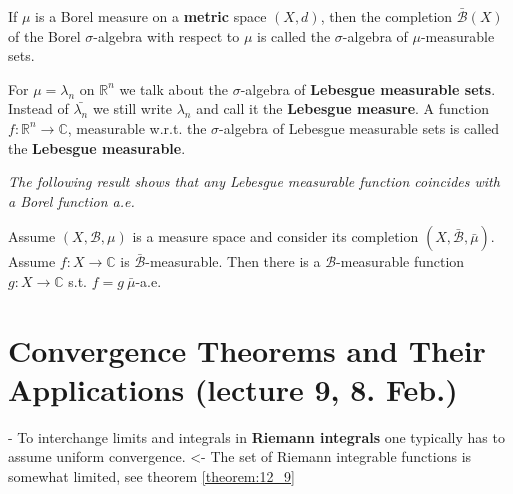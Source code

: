 
\begin{definition}
    If \(\mu\) is a Borel measure on a \textbf{metric} space \((X,d)\), then the completion \(\bar{\mathscr{B}}(X)\) of the Borel \(\sigma\)-algebra
    with respect to \(\mu\) is called the \(\sigma\)-algebra of \(\mu\)-measurable sets. 
\end{definition}
\begin{remark}
    For \(\mu=\lambda_n\) on \(\mathbb{R}^n\) we talk about the \(\sigma\)-algebra of \textbf{Lebesgue measurable sets}. Instead of
    \(\bar{\lambda_n}\) we still write \(\lambda_n\) and call it the \textbf{Lebesgue measure}. A function \(f:\mathbb{R}^n\rightarrow \mathbb{C}\),
    measurable w.r.t. the \(\sigma\)-algebra of Lebesgue measurable sets is called the \textbf{Lebesgue measurable}.
\end{remark}
\emph{The following result shows that any Lebesgue measurable function coincides with a Borel function a.e.}
\begin{proposition}
    Assume \(\left( X,\mathscr{B},\mu \right)\) is a measure space and consider its completion \(\left( X,\bar{\mathscr{B}},\bar{\mu} \right)\).
    Assume \(f:X\rightarrow\mathbb{C}\) is \(\bar{\mathscr{B}}\)-measurable. Then there is a \(\mathscr{B}\)-measurable function 
    \(g:X\rightarrow\mathbb{C}\) s.t. \(f=g \ \bar{\mu}\)-a.e.
\end{proposition}

\section{Convergence Theorems and Their Applications (lecture 9, 8. Feb.)}
- To interchange limits and integrals in \textbf{Riemann integrals} one typically has to assume uniform convergence. <- The set of Riemann
integrable functions is somewhat limited, see theorem \ref{theorem:12_9}

